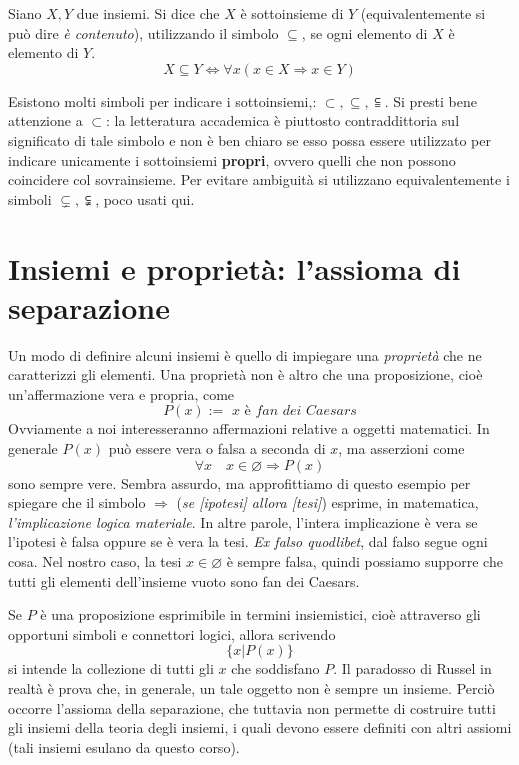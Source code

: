 \begin{tcolorbox}[colback=yellow!30, colframe=yellow!30!black, title={Sottoinsiemi}]
Siano $X,Y$ due insiemi. Si dice che $X$ è sottoinsieme di $Y$
(equivalentemente si può dire \emph{è contenuto}), utilizzando il simbolo $\subseteq$,
se ogni elemento di $X$ è elemento di $Y$.
\[ X \subseteq Y \Longleftrightarrow \forall x(x\in X \Rightarrow x\in Y) \]
\end{tcolorbox}

\begin{osservaz}
Esistono molti simboli per indicare i
sottoinsiemi,: $\subset,\subseteq,\subseteqq$.
Si presti bene attenzione a $\subset$: la letteratura
accademica è piuttosto contraddittoria sul significato di tale
simbolo e non è ben chiaro se esso possa essere utilizzato per
indicare unicamente i sottoinsiemi \textbf{propri}, ovvero quelli
che non possono coincidere col sovrainsieme. Per evitare
ambiguità si utilizzano equivalentemente i simboli $\subsetneq,\subsetneqq$, poco usati
qui.
\end{osservaz}

\section{Insiemi e proprietà: l'assioma di separazione}
Un modo di definire alcuni insiemi è quello di impiegare una \textit{proprietà}
che ne caratterizzi gli elementi. Una proprietà non è altro che una proposizione,
cioè un'affermazione vera e propria, come
\[ P(x) := \textit{ x è fan dei Caesars} \]
Ovviamente a noi interesseranno affermazioni relative a oggetti matematici.
In generale $P(x)$ può essere vera o falsa a seconda di $x$, ma asserzioni come
\[ \forall x \quad x\in\varnothing\Longrightarrow P(x) \]
sono sempre vere. Sembra assurdo, ma approfittiamo di questo esempio per
spiegare che il simbolo $\Longrightarrow$ (\textit{se [ipotesi] allora [tesi]}) esprime, in matematica, \textit{l'implicazione logica materiale}.
In altre parole, l'intera implicazione è vera se l'ipotesi è falsa oppure se
è vera la tesi. \textit{Ex falso quodlibet}, dal falso segue ogni cosa. Nel
nostro caso, la tesi $x\in\varnothing$ è sempre falsa, quindi possiamo
supporre che tutti gli elementi dell'insieme vuoto sono fan dei Caesars.


Se $P$ è una proposizione esprimibile
in termini insiemistici, cioè attraverso gli opportuni simboli e connettori
logici, allora scrivendo
\[\{x|P(x)\}\]
si intende la collezione di tutti gli $x$ che soddisfano $P$. Il paradosso
di Russel in realtà è prova che, in generale, un tale oggetto non è
sempre un insieme. Perciò occorre l'assioma della separazione, che tuttavia
non permette di costruire tutti gli insiemi della teoria degli insiemi, i
quali devono essere definiti con altri assiomi
(tali insiemi esulano da questo corso).

